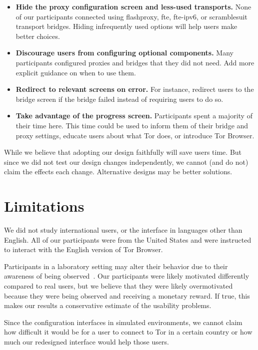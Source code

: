 \documentclass[USenglish,oneside,twocolumn]{article}
\begin{document}
\begin{itemize}
\item {\bfseries Hide the proxy configuration screen and less-used transports.} None of our participants connected using flashproxy, fte, fte-ipv6, or scramblesuit transport bridges. Hiding infrequently used options will help users make better choices.
\item {\bfseries Discourage users from configuring optional components.} Many participants configured proxies and bridges that they did not need. Add more explicit guidance on when to use them.
\item {\bfseries Redirect to relevant screens on error.} For instance, redirect users to the bridge screen if the bridge failed instead of requiring users to do so.
\item {\bfseries Take advantage of the progress screen.} Participants spent a majority of their time here. This time could be used to inform them of their bridge and proxy settings, educate users about what Tor does, or introduce Tor Browser.
\end{itemize}

While we believe that adopting our design faithfully will save users time. But since we did not test our design changes independently, we cannot (and do not) claim the effects each change. Alternative designs may be better solutions. 

\section{Limitations}
\label{sec:limitations}
We did not study international users, or the interface in languages other than English. All of our participants were from the United States and were instructed to interact with the English version of Tor Browser.

Participants in a laboratory setting may alter their behavior due to their awareness of being observed~\cite{mccarney2007hawthorne}. Our participants were likely motivated differently compared to real users, but we believe that they were likely overmotivated because they were being observed and receiving a monetary reward. If true, this makes our results a conservative estimate of the usability problems. 

Since the configuration interfaces in simulated environments, we cannot claim how difficult it would be for a user to connect to Tor in a certain country or how much our redesigned interface would help those users.  
\end{document}
